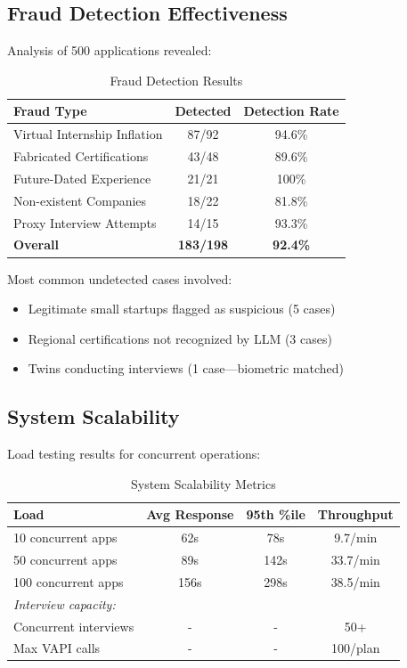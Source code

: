 \documentclass[conference]{IEEEtran}
\begin{document}
\subsection{Fraud Detection Effectiveness}

Analysis of 500 applications revealed:

\begin{table}[h]
\centering
\caption{Fraud Detection Results}
\label{tab:fraud_detection}
\begin{tabular}{@{}lcc@{}}
\toprule
\textbf{Fraud Type} & \textbf{Detected} & \textbf{Detection Rate} \\ \midrule
Virtual Internship Inflation & 87/92 & 94.6\% \\
Fabricated Certifications & 43/48 & 89.6\% \\
Future-Dated Experience & 21/21 & 100\% \\
Non-existent Companies & 18/22 & 81.8\% \\
Proxy Interview Attempts & 14/15 & 93.3\% \\ \midrule
\textbf{Overall} & \textbf{183/198} & \textbf{92.4\%} \\ \bottomrule
\end{tabular}
\end{table}

Most common undetected cases involved:
\begin{itemize}
    \item Legitimate small startups flagged as suspicious (5 cases)
    \item Regional certifications not recognized by LLM (3 cases)
    \item Twins conducting interviews (1 case—biometric matched)
\end{itemize}

\subsection{System Scalability}

Load testing results for concurrent operations:

\begin{table}[h]
\centering
\caption{System Scalability Metrics}
\label{tab:scalability}
\begin{tabular}{@{}lccc@{}}
\toprule
\textbf{Load} & \textbf{Avg Response} & \textbf{95th \%ile} & \textbf{Throughput} \\ \midrule
10 concurrent apps & 62s & 78s & 9.7/min \\
50 concurrent apps & 89s & 142s & 33.7/min \\
100 concurrent apps & 156s & 298s & 38.5/min \\
\midrule
\multicolumn{4}{l}{\textit{Interview capacity:}} \\
Concurrent interviews & - & - & 50+ \\
Max VAPI calls & - & - & 100/plan \\ \bottomrule
\end{tabular}
\end{table}
\end{document}
